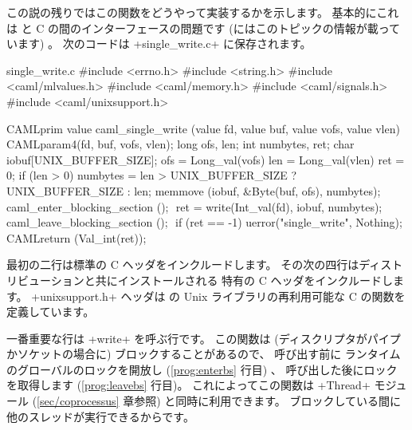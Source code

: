 この説の残りではこの関数をどうやって実装するかを示します。
基本的にこれは \ocaml と C の間のインターフェースの問題です (\ocaml にはこのトピックの情報が載っています) 。
次のコードは \ml+single_write.c+ に保存されます。
%
\begin{listingcodefile}[style=numbers]{single_write.c}
#include <errno.h>
#include <string.h>
#include <caml/mlvalues.h>
#include <caml/memory.h>
#include <caml/signals.h>
#include <caml/unixsupport.h>

CAMLprim value caml_single_write
        (value fd, value buf, value vofs, value vlen) {
  CAMLparam4(fd, buf, vofs, vlen);
  long ofs, len;
  int numbytes, ret;
  char iobuf[UNIX_BUFFER_SIZE];
  ofs = Long_val(vofs)
  len = Long_val(vlen)
  ret = 0;
  if (len > 0) {
    numbytes = len > UNIX_BUFFER_SIZE ? UNIX_BUFFER_SIZE : len;
    memmove (iobuf, &Byte(buf, ofs), numbytes);
    caml_enter_blocking_section (); $\label{prog:enterbs}$
    ret = write(Int_val(fd), iobuf, numbytes);
    caml_leave_blocking_section (); $\label{prog:leavebs}$
    if (ret == -1) uerror("single_write", Nothing);
  }
  CAMLreturn (Val_int(ret));
}
\end{listingcodefile}
%
最初の二行は標準の C ヘッダをインクルードします。
その次の四行はディストリビューションと共にインストールされる \ocaml 特有の C ヘッダをインクルードします。
\ml+unixsupport.h+ ヘッダは \ocaml の Unix ライブラリの再利用可能な C の関数を定義しています。

一番重要な行は \ml+write+ を呼ぶ行です。
この関数は (ディスクリプタがパイプかソケットの場合に) ブロックすることがあるので、
呼び出す前に \ocaml ランタイムのグローバルのロックを開放し (\ref{prog:enterbs} 行目) 、
呼び出した後にロックを取得します (\ref{prog:leavebs} 行目)。
これによってこの関数は \ml+Thread+ モジュール (\ref{sec/coprocessus} 章参照) と同時に利用できます。
ブロックしている間に他のスレッドが実行できるからです。

